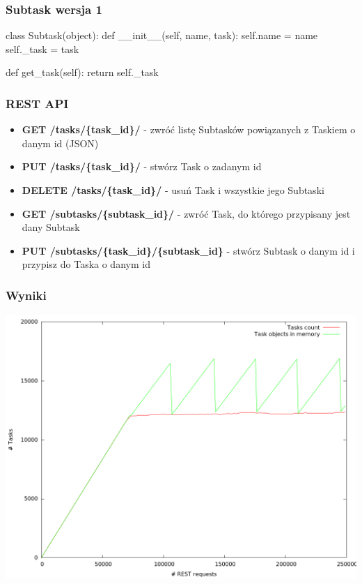 \documentclass{beamer}
\begin{document}
    \begin{frame}[fragile]
        \frametitle{Subtask wersja 1}
        \begin{semiverbatim}
class Subtask(object):
    def __init__(self, name, task):
        self.name = name
        self._task = task

    def get_task(self):
        return self._task
        \end{semiverbatim}
\end{frame}

    \begin{frame}
        \frametitle{REST API}
        \begin{itemize}
            \item \textbf{GET /tasks/\{task\_id\}/} - zwróć listę Subtasków powiązanych z Taskiem o danym id (JSON)
            \item \textbf{PUT /tasks/\{task\_id\}/} - stwórz Task o zadanym id
            \item \textbf{DELETE /tasks/\{task\_id\}/} - usuń Task i wszystkie jego Subtaski
            \item \textbf{GET /subtasks/\{subtask\_id\}/} - zwróć Task, do którego przypisany jest dany Subtask
            \item \textbf{PUT /subtasks/\{task\_id\}/\{subtask\_id\}} - stwórz Subtask o danym id i przypisz do Taska o danym id
        \end{itemize}
    \end{frame}

    \begin{frame}
        \frametitle{Wyniki}
        \includegraphics[height=0.8\textheight]{gc_tasks.png}
    \end{frame}
\end{document}
